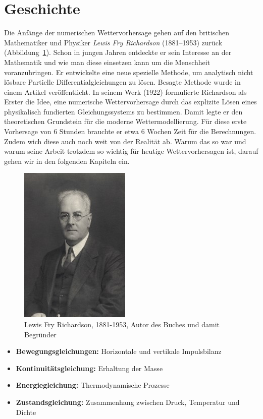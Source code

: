 %
%
%
%
\section{Geschichte\label{geostrophisch:section:geschichte}}

Die Anfänge der numerischen Wettervorhersage gehen auf den britischen Mathematiker und Physiker \emph{Lewis Fry Richardson} (1881–1953) zurück (Abbildung~\ref{bild:portraitRichi}).
Schon in jungen Jahren entdeckte er sein Interesse an der Mathematik und wie man diese einsetzen kann um die Menschheit voranzubringen.
Er entwickelte eine neue spezielle Methode, um analytisch nicht lösbare Partielle Differentialgleichungen zu lösen. 
Besagte Methode wurde in einem Artikel veröffentlicht. 
In seinem Werk \cite{geostrophisch:wpbnp} (1922) formulierte Richardson als Erster die Idee, eine numerische Wettervorhersage durch das explizite Lösen eines physikalisch fundierten Gleichungssystems zu bestimmen.  
Damit legte er den theoretischen Grundstein für die moderne Wettermodellierung.
Für diese erste Vorhersage von 6 Stunden brauchte er etwa 6 Wochen Zeit für die Berechnungen.
Zudem wich diese auch noch weit von der Realität ab.
Warum das so war und warum seine Arbeit trotzdem so wichtig für heutige Wettervorhersagen ist, darauf gehen wir in den folgenden Kapiteln ein. 

\begin{figure}[h]
	\centering
	\includegraphics{Portrait_Richardson.jpg}
	\caption{Lewis Fry Richardson, 1881-1953, Autor des Buches \cite{geostrophisch:wpbnp} und damit Begründer }
	\label{bild:portraitRichi}
\end{figure}

\begin{itemize}
	\item \textbf{Bewegungsgleichungen:} Horizontale und vertikale Impulsbilanz
	\item \textbf{Kontinuitätsgleichung:} Erhaltung der Masse
	\item \textbf{Energiegleichung:} Thermodynamische Prozesse
	\item \textbf{Zustandsgleichung:} Zusammenhang zwischen Druck, Temperatur und Dichte
\end{itemize}






